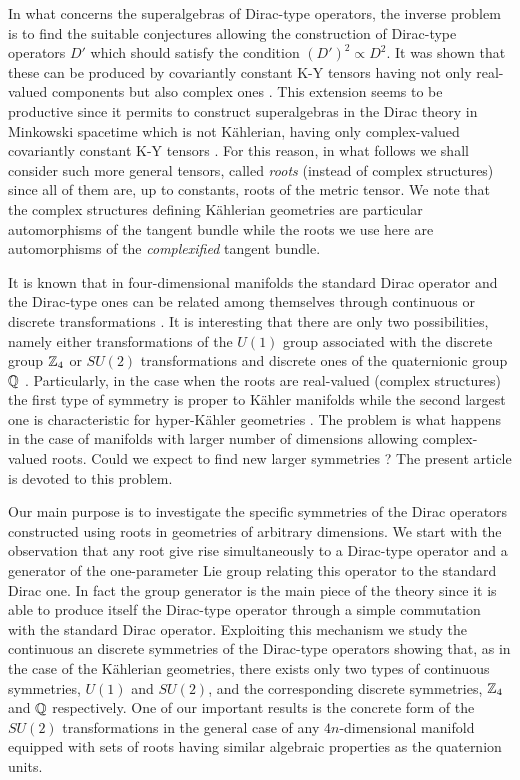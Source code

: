 \documentclass[a4paper,12pt]{article}
\begin{document}
In what concerns the superalgebras of Dirac-type operators, the inverse 
problem is to find the suitable conjectures allowing the construction of 
Dirac-type operators $D'$ which should satisfy the condition 
$(D')^2\propto D^2$. It 
was shown that these can be produced by covariantly constant K-Y tensors 
having not only real-valued components but also complex ones \cite{K1,K2}. 
This extension seems to be productive since it permits to construct 
superalgebras in the Dirac theory in Minkowski spacetime which is not 
K\" ahlerian, having only complex-valued covariantly constant K-Y tensors 
\cite{K2}. For this reason, in what follows we shall consider such more 
general tensors, called  {\em roots} (instead of complex structures) since all 
of them are, up to constants, roots of the metric tensor. We note that
the complex structures defining K\" ahlerian geometries are 
particular automorphisms of the tangent bundle while the roots we use  
here are automorphisms of the {\em complexified} tangent bundle.   

It is known that in four-dimensional manifolds the standard Dirac operator 
and the Dirac-type ones can be related among themselves through continuous 
or discrete transformations \cite{CV1,K2}. It is interesting that there 
are only two possibilities, namely either transformations of the $U(1)$ group 
associated with the discrete group ${\Bbb Z}_4$ or $SU(2)$ transformations 
and discrete ones of the quaternionic group ${\Bbb Q}$ \cite{CV1,K2}. 
Particularly, in the case when the roots are real-valued (complex structures) 
the first type of symmetry is proper to  K\" ahler manifolds while the second 
largest one is characteristic for hyper-K\" ahler geometries \cite{CV1}. The 
problem is what happens in the case of manifolds with larger number of 
dimensions allowing complex-valued roots. Could we expect to find new larger 
symmetries ? The present article is devoted to this problem.      

Our main purpose is to investigate the specific symmetries of 
the Dirac operators constructed using roots in geometries of arbitrary 
dimensions. We start with the observation that any root give rise 
simultaneously to a Dirac-type operator and a generator of the one-parameter 
Lie group relating this operator to the standard Dirac one. In fact the 
group generator is the main piece of the theory since it is able to produce 
itself the Dirac-type operator through a simple commutation with 
the standard Dirac operator. Exploiting this mechanism we study the 
continuous an discrete symmetries of the Dirac-type operators showing that, 
as in the case of the K\" ahlerian geometries, there exists only two 
types of continuous symmetries, $U(1)$ and $SU(2)$, and the corresponding 
discrete symmetries, ${\Bbb Z}_4$ and ${\Bbb Q}$ respectively. One 
of our important results is the concrete form of the $SU(2)$ transformations 
in the general case of any $4n$-dimensional manifold equipped with 
sets of roots having similar algebraic properties as the quaternion units.       
\end{document}
